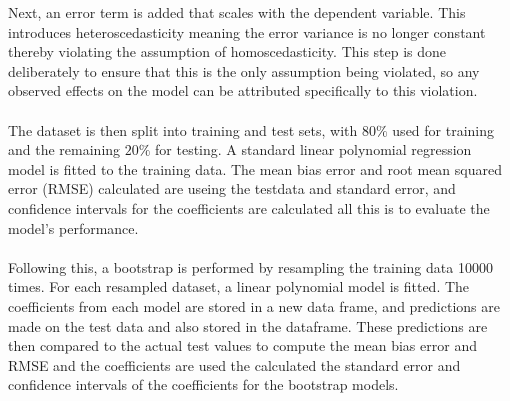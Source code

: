 \noindent Next, an error term is added that scales with the dependent variable. This introduces heteroscedasticity meaning the error variance is no longer constant thereby violating the assumption of homoscedasticity. This step is done deliberately to ensure that this is the only assumption being violated, so any observed effects on the model can be attributed specifically to this violation.
\\\\

The dataset is then split into training and test sets, with $80\%$ used for training and the remaining $20\%$ for testing. A standard linear polynomial regression model is fitted to the training data. The mean bias error and root mean squared error (RMSE) calculated are useing the testdata and standard error, and confidence intervals for the coefficients are calculated all this is to evaluate the model's performance.
\\\\



\noindent Following this, a bootstrap is performed by resampling the training data 10000 times. For each resampled dataset, a linear polynomial model is fitted. The coefficients from each model are stored in a new data frame, and predictions are made on the test data and also stored in the dataframe. These predictions are then compared to the actual test values to compute the mean bias error and RMSE and the coefficients are used the calculated the standard error and confidence intervals of the coefficients for the bootstrap models.
\\\\



